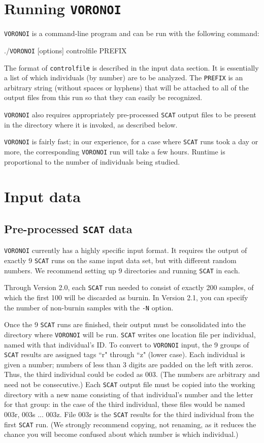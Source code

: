 \documentclass[10pt,titlepage,times,letterpaper]{article}
\def\SCAT{{\tt SCAT} }
\def\VORONOI{{\tt VORONOI} }
\begin{document}
\section{Running \VORONOI}

\VORONOI is a command-line program and can be run with the following command:

./\VORONOI [options] controlfile PREFIX

The format of {\tt controlfile} is described in the input data section.  It is essentially a list
of which individuals (by number) are to be analyzed.  The {\tt PREFIX} is an arbitrary string (without
spaces or hyphens) that will be attached to all of the output files from this run so that they can
easily be recognized.

\VORONOI also requires appropriately pre-processed \SCAT output files to be present in the
directory where it is invoked, as described below.

\VORONOI is fairly fast; in our experience, for a case where \SCAT runs took a day or 
more, the corresponding \VORONOI run will take a few hours.  Runtime is proportional to
the number of individuals being studied.

\section{Input data}

\subsection{Pre-processed \SCAT data}

\VORONOI currently has a highly specific input format.  It requires the output of exactly
9 \SCAT runs on the same input data set, but with different random numbers.  
We recommend setting up 9 directories and running \SCAT in each.

Through Version 2.0, each \SCAT run needed to consist of exactly 200 samples, of which
the first 100 will be discarded as burnin.  In Version 2.1, you can specify the number of
non-burnin samples with the {\tt -N} option.

Once the 9 \SCAT runs are finished, their output must be consolidated into the directory
where \VORONOI will be run.
\SCAT writes one location file per individual, named with that individual's ID. 
To convert to \VORONOI input, the 9 groups of \SCAT
results are assigned tags ``r" through ``z" (lower case).  Each individual is 
given a number; numbers of less than 3 digits are padded on the left with zeros.  Thus, the
third individual could be coded as 003.  (The numbers are arbitrary and need not 
be consecutive.)  Each \SCAT output file must be copied into the working
directory with a new name consisting of that individual's number
and the letter for that group:  in the case of the third individual, these files would
be named 003r, 003s ... 003z.  File 003r is the \SCAT results for the third individual from
the first \SCAT run.  (We strongly recommend copying, not renaming, as it reduces
the chance you will become confused about which number is which individual.)
\end{document}
